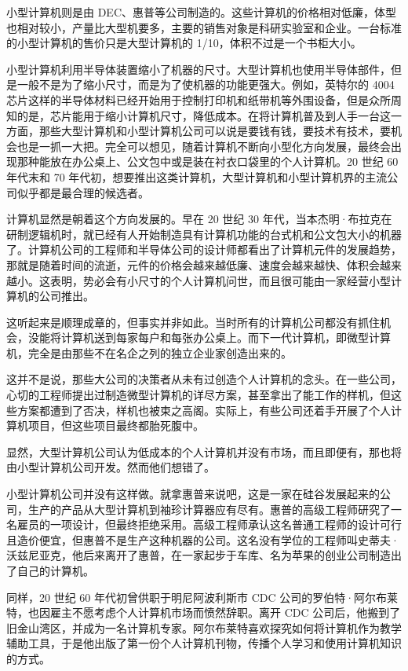 \documentclass[12pt,UTF8]{ctexbook}
\begin{document}
小型计算机则是由 DEC、惠普等公司制造的。这些计算机的价格相对低廉，体型也相对较小，产量比大型机要多，主要的销售对象是科研实验室和企业。一台标准的小型计算机的售价只是大型计算机的 1/10，体积不过是一个书柜大小。

小型计算机利用半导体装置缩小了机器的尺寸。大型计算机也使用半导体部件，但是一般不是为了缩小尺寸，而是为了使机器的功能更强大。例如，英特尔的 4004 芯片这样的半导体材料已经开始用于控制打印机和纸带机等外围设备，但是众所周知的是，芯片能用于缩小计算机尺寸，降低成本。在将计算机普及到人手一台这一方面，那些大型计算机和小型计算机公司可以说是要钱有钱，要技术有技术，要机会也是一抓一大把。完全可以想见，随着计算机不断向小型化方向发展，最终会出现那种能放在办公桌上、公文包中或是装在衬衣口袋里的个人计算机。20 世纪 60 年代末和 70 年代初，想要推出这类计算机，大型计算机和小型计算机界的主流公司似乎都是最合理的候选者。

计算机显然是朝着这个方向发展的。早在 20 世纪 30 年代，当本杰明·布拉克在研制逻辑机时，就已经有人开始制造具有计算机功能的台式机和公文包大小的机器了。计算机公司的工程师和半导体公司的设计师都看出了计算机元件的发展趋势，那就是随着时间的流逝，元件的价格会越来越低廉、速度会越来越快、体积会越来越小。这表明，势必会有小尺寸的个人计算机问世，而且很可能由一家经营小型计算机的公司推出。

这听起来是顺理成章的，但事实并非如此。当时所有的计算机公司都没有抓住机会，没能将计算机送到每家每户和每张办公桌上。而下一代计算机，即微型计算机，完全是由那些不在名企之列的独立企业家创造出来的。

这并不是说，那些大公司的决策者从未有过创造个人计算机的念头。在一些公司，心切的工程师提出过制造微型计算机的详尽方案，甚至拿出了能工作的样机，但这些方案都遭到了否决，样机也被束之高阁。实际上，有些公司还着手开展了个人计算机项目，但这些项目最终都胎死腹中。

显然，大型计算机公司认为低成本的个人计算机并没有市场，而且即便有，那也将由小型计算机公司开发。然而他们想错了。

小型计算机公司并没有这样做。就拿惠普来说吧，这是一家在硅谷发展起来的公司，生产的产品从大型计算机到袖珍计算器应有尽有。惠普的高级工程师研究了一名雇员的一项设计，但最终拒绝采用。高级工程师承认这名普通工程师的设计可行且造价便宜，但惠普不是生产这种机器的公司。这名没有学位的工程师叫史蒂夫·沃兹尼亚克，他后来离开了惠普，在一家起步于车库、名为苹果的创业公司制造出了自己的计算机。

同样，20 世纪 60 年代初曾供职于明尼阿波利斯市 CDC 公司的罗伯特·阿尔布莱特，也因雇主不愿考虑个人计算机市场而愤然辞职。离开 CDC 公司后，他搬到了旧金山湾区，并成为一名计算机专家。阿尔布莱特喜欢探究如何将计算机作为教学辅助工具，于是他出版了第一份个人计算机刊物，传播个人学习和使用计算机知识的方式。
\end{document}
